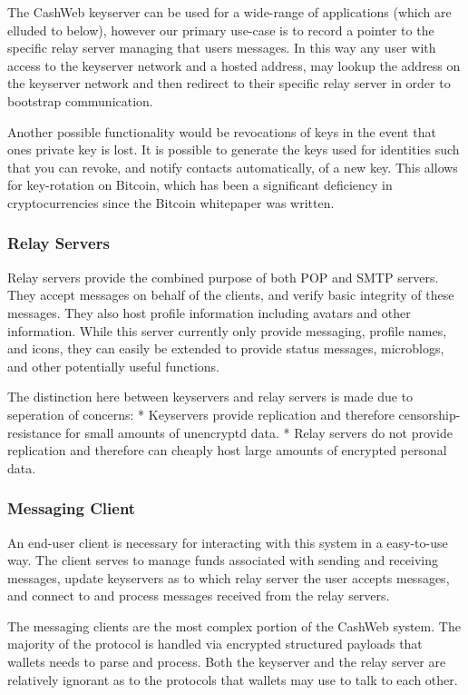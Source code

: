 \documentclass{article}
\begin{document}
The CashWeb keyserver can be used for a wide-range of applications (which are elluded to below), however our primary use-case is to record a pointer to the specific relay server managing that users messages. In this way any user with access to the keyserver network and a hosted address, may lookup the address on the keyserver network and then redirect to their specific relay server in order to bootstrap communication. 

Another possible functionality would be revocations of keys in the event that ones private key is lost. It is possible to generate the keys used for identities such that you can revoke, and notify contacts automatically, of a new key. This allows for key-rotation on Bitcoin, which has been a significant deficiency in cryptocurrencies since the Bitcoin whitepaper was written.

\subsubsection{Relay Servers}

Relay servers provide the combined purpose of both POP and SMTP servers. They accept messages on behalf of the clients, and verify basic integrity of these messages. They also host profile information including avatars and other information. While this server currently only provide messaging, profile names, and icons, they can easily be extended to provide status messages, microblogs, and other potentially useful functions.

The distinction here between keyservers and relay servers is made due to seperation of concerns:
* Keyservers provide replication and therefore censorship-resistance for small amounts of unencryptd data.
* Relay servers do not provide replication and therefore can cheaply host large amounts of encrypted personal data.

\subsubsection{Messaging Client}

An end-user client is necessary for interacting with this system in a easy-to-use way. The client serves to manage funds associated with sending and receiving messages, update keyservers as to which relay server the user accepts messages, and connect to and process messages received from the relay servers.

The messaging clients are the most complex portion of the CashWeb system. The majority of the protocol is handled via encrypted structured payloads that wallets needs to parse and process. Both the keyserver and the relay server are relatively ignorant as to the protocols that wallets may use to talk to each other.
\end{document}
